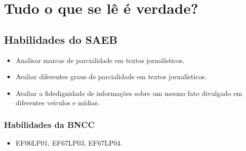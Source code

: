 
\chapter{Tudo o que se lê é verdade?}

\section*{Habilidades do SAEB}
\begin{itemize}
\item Analisar marcas de parcialidade em textos
jornalísticos. 
\item Avaliar diferentes graus de parcialidade em textos
jornalísticos. 
\item Avaliar a fidedignidade de informações sobre um mesmo
fato divulgado em diferentes veículos e mídias.
\end{itemize}

\subsection*{Habilidades da BNCC}
\begin{itemize}
\item EF06LP01, EF67LP03, EF67LP04.
\end{itemize}

